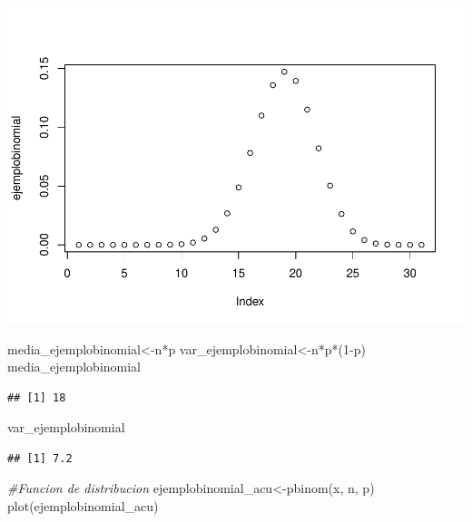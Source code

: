 \documentclass[
]{article}
\newenvironment{Shaded}{\begin{snugshade}}{\end{snugshade}}
\newcommand{\CommentTok}[1]{\textcolor[rgb]{0.56,0.35,0.01}{\textit{#1}}}
\newcommand{\DecValTok}[1]{\textcolor[rgb]{0.00,0.00,0.81}{#1}}
\newcommand{\FunctionTok}[1]{\textcolor[rgb]{0.00,0.00,0.00}{#1}}
\newcommand{\NormalTok}[1]{#1}
\newcommand{\OtherTok}[1]{\textcolor[rgb]{0.56,0.35,0.01}{#1}}
\newcommand{\SpecialCharTok}[1]{\textcolor[rgb]{0.00,0.00,0.00}{#1}}
\begin{document}
\includegraphics{Teoria4_files/figure-latex/unnamed-chunk-2-1.pdf}

\begin{Shaded}
\begin{Highlighting}[]
\NormalTok{media\_ejemplobinomial}\OtherTok{\textless{}{-}}\NormalTok{n}\SpecialCharTok{*}\NormalTok{p}
\NormalTok{var\_ejemplobinomial}\OtherTok{\textless{}{-}}\NormalTok{n}\SpecialCharTok{*}\NormalTok{p}\SpecialCharTok{*}\NormalTok{(}\DecValTok{1}\SpecialCharTok{{-}}\NormalTok{p)}
\NormalTok{media\_ejemplobinomial}
\end{Highlighting}
\end{Shaded}

\begin{verbatim}
## [1] 18
\end{verbatim}

\begin{Shaded}
\begin{Highlighting}[]
\NormalTok{var\_ejemplobinomial}
\end{Highlighting}
\end{Shaded}

\begin{verbatim}
## [1] 7.2
\end{verbatim}

\begin{Shaded}
\begin{Highlighting}[]
\CommentTok{\#Funcion de distribucion}
\NormalTok{ejemplobinomial\_acu}\OtherTok{\textless{}{-}}\FunctionTok{pbinom}\NormalTok{(x, n, p)}
\FunctionTok{plot}\NormalTok{(ejemplobinomial\_acu)}
\end{Highlighting}
\end{Shaded}
\end{document}
